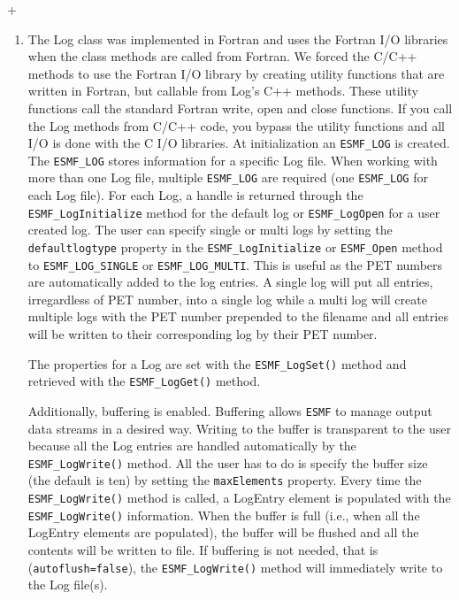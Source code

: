 +%
%
\begin{enumerate}
\item The Log class was implemented in Fortran and uses the Fortran I/O 
libraries when the class methods are called from Fortran. We forced the C/C++
methods to use the Fortran I/O library by creating utility functions that are
written in Fortran, but callable from Log's C++ methods.  These utility 
functions call the standard Fortran write, open and close functions.  If you
call the Log methods from C/C++ code, you bypass the utility functions and 
all I/O is done with the C I/O libraries.
At initialization an {\tt ESMF\_LOG} is created.  The {\tt ESMF\_LOG} stores 
information for a specific Log file.   When working with more than one 
Log file, multiple {\tt ESMF\_LOG} are required (one {\tt ESMF\_LOG} for each 
Log file).  For each Log, a handle is returned through the 
{\tt ESMF\_LogInitialize} method for the default log or {\tt ESMF\_LogOpen} 
for a user created log.  The user can specify single or multi logs by setting
the {\tt defaultlogtype} property in the {\tt ESMF\_LogInitialize} or 
{\tt ESMF\_Open} method to {\tt ESMF\_LOG\_SINGLE} or {\tt ESMF\_LOG\_MULTI}.
This is useful as the PET numbers are automatically added to the log entries.
A single log will put all entries, irregardless of PET number, into a single
log while a multi log will create multiple logs with the PET number prepended
to the filename and all entries will be written to their corresponding log 
by their PET number.

The properties for a Log are set with the {\tt ESMF\_LogSet()} method and 
retrieved with the {\tt ESMF\_LogGet()} method.

Additionally, buffering is enabled.  Buffering allows {\tt ESMF} to manage 
output data streams in a desired way.  Writing to the buffer is transparent 
to the user because all the Log entries are handled automatically by the 
{\tt ESMF\_LogWrite()} method.  All the user has to do is specify the buffer
size (the default is ten) by setting the {\tt maxElements} property.  Every 
time the {\tt ESMF\_LogWrite()} method is called, a LogEntry element is 
populated with the {\tt ESMF\_LogWrite()} information.  When the buffer is 
full (i.e., when all the LogEntry elements are populated), the buffer will be 
flushed and all the contents will be written to file.  If buffering is not 
needed, that is ({\tt autoflush=false}), the {\tt ESMF\_LogWrite()} method 
will immediately write to the Log file(s).
\end{enumerate}




